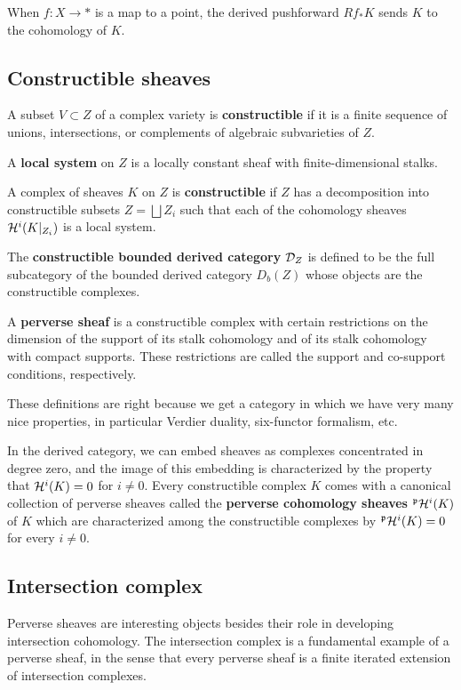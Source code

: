 \documentclass[12pt]{article}
\begin{document}
\begin{remark}
    When $f:X\to *$ is a map to a point, the derived pushforward $Rf_*K$ sends $K$ to the
    cohomology of $K$.
\end{remark}

\subsection{Constructible sheaves}
\begin{definition}
    A subset $V \subset Z$ of a complex variety is \textbf{constructible} if it is a finite
    sequence of unions, intersections, or complements of algebraic subvarieties of $Z$.

    A \textbf{local system} on $Z$ is a locally constant sheaf with finite-dimensional stalks.

    A complex of sheaves $K$ on $Z$ is \textbf{constructible} if $Z$ has a decomposition into constructible subsets $Z = \bigsqcup Z_i$ such that each of the cohomology sheaves ${\mathcal{H}}^i(K\vert_{Z_i})$ is a local system.

    The \textbf{constructible bounded derived category} ${\mathcal{D}}_Z$
    is defined to be the full subcategory of the bounded derived category $D_b(Z)$
    whose objects are the constructible complexes.

    A \textbf{perverse sheaf} is a constructible complex with certain restrictions
    on the dimension of the support of its stalk cohomology
    and of its stalk cohomology with compact supports.
    These restrictions are called the support and
    co-support conditions, respectively.
\end{definition}
\begin{remark}
    These definitions are right because we get a category in which
    we have very many nice properties, in particular
    Verdier duality, six-functor formalism, etc.
\end{remark}
In the derived category, we can embed sheaves as complexes
concentrated in degree zero, and the image of
this embedding is characterized by the property that ${\mathcal{H}}^i(K) = 0$ for $i\neq 0$.
Every constructible complex $K$ comes with a canonical collection of perverse
sheaves called the \textbf{perverse cohomology sheaves} $^{\mathfrak{p}} {\mathcal{H}}^i(K)$ of $K$
which are characterized among the constructible complexes by $^{\mathfrak{p}} {\mathcal{H}}^i(K) = 0$
for every $i\neq 0$.

\subsection{Intersection complex}
Perverse sheaves are interesting objects besides their role in developing
intersection cohomology. The intersection complex is a fundamental example of a perverse
sheaf, in the sense that every perverse sheaf is a finite iterated extension
of intersection complexes.
\end{document}

